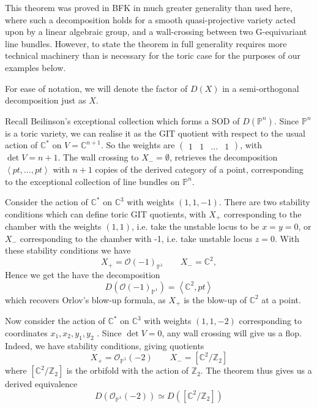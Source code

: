 This theorem was proved in BFK in much greater generality than used here, where such a decomposition holds for a smooth quasi-projective variety acted upon by a linear algebraic group, and a wall-crossing between two G-equivariant line bundles. However, to state the theorem in full generality requires more technical machinery than is necessary for the toric case for the purposes of our examples below. 

For ease of notation, we will denote the factor of $D(X)$ in a semi-orthogonal decomposition just as $X$. 

\begin{example}{}{}
    Recall Beilinson's exceptional collection which forms a SOD of $D(\mathbb{P}^n)$. Since $\mathbb{P}^n$ is a toric variety, we can realise it as the GIT quotient with respect to the usual action of $\mathbb{C}^*$ on $V = \mathbb{C}^{n+1}$. So the weights are $\begin{pmatrix}1 & 1 &\dots &1\end{pmatrix}$, with $\det V = n+1$. The wall crossing to $X_{-}=\emptyset$, retrieves the decomposition $\left< pt, \dots,pt \right>$ with $n+1$ copies of the derived category of a point, corresponding to the exceptional collection of line bundles on $\mathbb{P}^n$. 
\end{example}

\begin{example}{}{}
    Consider the action of $\mathbb{C}^{*}$ on $\mathbb{C}^3$ with weights $(1,1,-1)$. There are two stability conditions which can define toric GIT quotients, with $X_+$ corresponding to the chamber with the weights $(1,1)$, i.e. take the unstable locus to be $x=y= 0$, or $X_-$ corresponding to the chamber with -1, i.e. take unstable locus $z = 0$. With these stability conditions we have $$X_{+}= \mathcal{O}(-1)_{\mathbb{P}^{1}} \qquad X_{-}= \mathbb{C}^2, $$ Hence we get the have the decomposition $$D(\mathcal{O}(-1)_{\mathbb{P}^{1}})= \left< \mathbb{C}^{2}, pt \right> $$ which recovers Orlov's blow-up formula, as $X_+$ is the blow-up of $\mathbb{C}^2$ at a point.
\end{example}

\begin{example}{}{}
    Now consider the action of $\mathbb{C}^{*}$ on $\mathbb{C}^3$ with weights $(1,1,-2)$ corresponding to coordinates $x_{1},x_{2},y_1,y_2$ .  Since $\det V = 0$, any wall crossing will give us a flop. Indeed, we have stability conditions, giving quotients $$X_{+}= \mathcal{O}_{\mathbb{P}^{1}}(-2) \qquad X_{-}= [\mathbb{C}^{2}/ \mathbb{Z}_2]  $$where $[\mathbb{C}^2/\mathbb{Z}_2]$ is the orbifold with the action of $\mathbb{Z}_2$. The theorem thus gives us a derived equivalence $$D(\mathcal{O}_{\mathbb{P}^{1}}(-2))\simeq D([\mathbb{C}^{2}/\mathbb{Z}_{2}])$$
\end{example}


